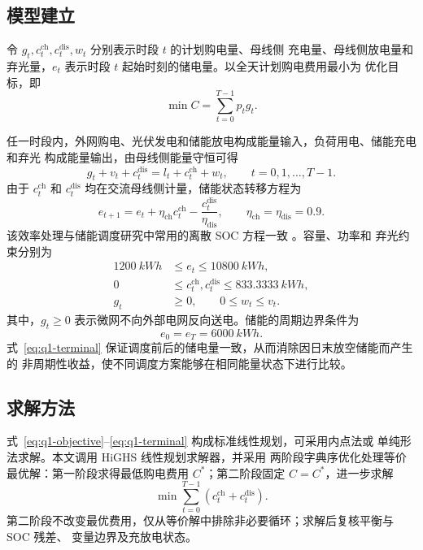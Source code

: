 \documentclass[withoutpreface,bwprint]{cumcmthesis}
\begin{document}
\subsection{模型建立}

令 $g_t,c_t^{\mathrm{ch}},c_t^{\mathrm{dis}},w_t$ 分别表示时段 $t$ 的计划购电量、母线侧
充电量、母线侧放电量和弃光量，$e_t$ 表示时段 $t$ 起始时刻的储电量。以全天计划购电费用最小为
优化目标，即
\begin{equation}
  \min C=\sum_{t=0}^{T-1}p_tg_t.
  \label{eq:q1-objective}
\end{equation}

任一时段内，外网购电、光伏发电和储能放电构成能量输入，负荷用电、储能充电和弃光
构成能量输出，由母线侧能量守恒可得
\begin{equation}
  g_t+v_t+c_t^{\mathrm{dis}}=l_t+c_t^{\mathrm{ch}}+w_t,
  \qquad t=0,1,\ldots,T-1.
  \label{eq:q1-balance}
\end{equation}
由于 $c_t^{\mathrm{ch}}$ 和 $c_t^{\mathrm{dis}}$ 均在交流母线侧计量，储能状态转移方程为
\begin{equation}
  e_{t+1}=e_t+\eta_{\mathrm{ch}}c_t^{\mathrm{ch}}
  -\frac{c_t^{\mathrm{dis}}}{\eta_{\mathrm{dis}}},
  \qquad \eta_{\mathrm{ch}}=\eta_{\mathrm{dis}}=0.9.
  \label{eq:q1-soc}
\end{equation}
该效率处理与储能调度研究中常用的离散 SOC 方程一致
\cite{gorman2024}。容量、功率和
弃光约束分别为
\begin{align}
  \SI{1200}{kWh}&\le e_t\le\SI{10800}{kWh}, \label{eq:q1-soc-bound}\\
  0&\le c_t^{\mathrm{ch}},c_t^{\mathrm{dis}}\le\SI{833.3333}{kWh}, \label{eq:q1-power-bound}\\
  g_t&\ge 0,\qquad 0\le w_t\le v_t. \label{eq:q1-flow-bound}
\end{align}
其中，$g_t\ge0$ 表示微网不向外部电网反向送电。储能的周期边界条件为
\begin{equation}
  e_0=e_T=\SI{6000}{kWh}.
  \label{eq:q1-terminal}
\end{equation}
式~\eqref{eq:q1-terminal} 保证调度前后的储电量一致，从而消除因日末放空储能而产生的
非周期性收益，使不同调度方案能够在相同能量状态下进行比较。

\subsection{求解方法}

式~\eqref{eq:q1-objective}--\eqref{eq:q1-terminal} 构成标准线性规划，可采用内点法或
单纯形法求解\cite{boyd2004}。本文调用 HiGHS 线性规划求解器\cite{scipy2020}，并采用
两阶段字典序优化处理等价最优解：第一阶段求得最低购电费用 $C^*$；第二阶段固定
$C=C^*$，进一步求解
\begin{equation}
  \min \sum_{t=0}^{T-1}(c_t^{\mathrm{ch}}+c_t^{\mathrm{dis}}).
  \label{eq:q1-tiebreak}
\end{equation}
第二阶段不改变最优费用，仅从等价解中排除非必要循环；求解后复核平衡与 SOC 残差、
变量边界及充放电状态。
\end{document}

